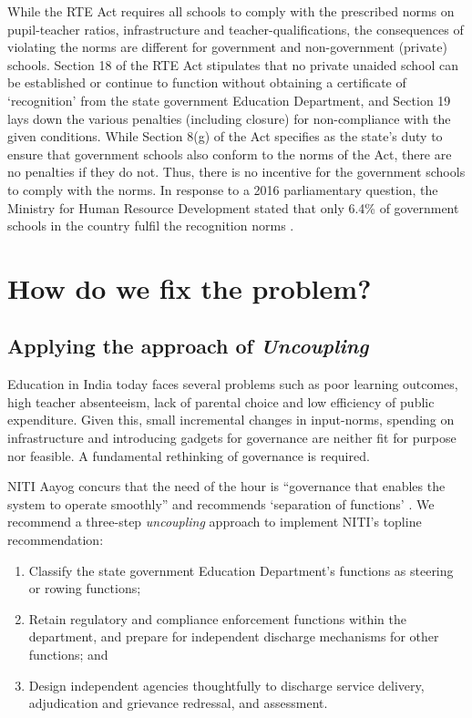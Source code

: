 \documentclass[a4paper, 12pt, twoside]{article}
\begin{document}
While the RTE Act requires all schools to comply with the prescribed norms on pupil-teacher ratios, infrastructure and teacher-qualifications, the consequences of violating the norms are different for government and non-government (private) schools. Section 18 of the RTE Act stipulates that no private unaided school can be established or continue to function without obtaining a certificate of ‘recognition’ from the state government Education Department, and Section 19 lays down the various penalties (including closure) for non-compliance with the given conditions. While Section 8(g) of the Act specifies as the state’s duty to ensure that government schools also conform to the norms of the Act, there are no penalties if they do not. Thus, there is no incentive for the government schools to comply with the norms. In response to a 2016 parliamentary question, the Ministry for Human Resource Development stated that only 6.4\% of government schools in the country fulfil the recognition norms \parencite{64_RTE}. 


\section*{How do we fix the problem?}
\subsection*{Applying the approach of \textit{Uncoupling}}

Education in India today faces several problems such as poor learning outcomes, high teacher absenteeism, lack of parental choice and low efficiency of public expenditure. Given this, small incremental changes in input-norms, spending on infrastructure and introducing gadgets for governance are neither fit for purpose nor feasible. A fundamental rethinking of governance is required. 

NITI Aayog concurs that the need of the hour is “governance that enables the system to operate smoothly” and recommends ‘separation of functions’ \parencite{niti3yearagenda}. We recommend a three-step \textit{uncoupling} approach to implement NITI’s topline recommendation:


\begin{enumerate}
\item Classify the state government Education Department’s functions as steering or rowing functions; 

\item Retain regulatory and compliance enforcement functions within the department, and prepare for independent discharge mechanisms for other functions; and

\item Design independent agencies thoughtfully to discharge service delivery, adjudication and grievance redressal, and assessment.
\end{enumerate}
\end{document}
